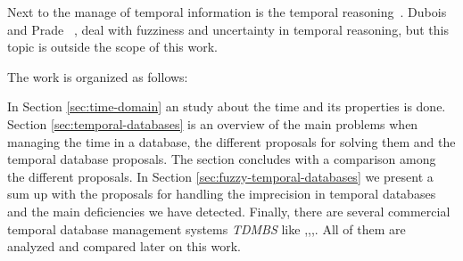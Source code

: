 Next to the manage of temporal information is the temporal reasoning~\cite{Allen83}. Dubois and Prade ~\cite{Dubois:jucs_9_9:fuzziness_and_uncertainty_in},\cite{Dubois89} deal with fuzziness and uncertainty in temporal reasoning, but this topic is outside the scope of this work.


The work is organized as follows: 

In Section \ref{sec:time-domain} an study about the time and its properties is done. Section \ref{sec:temporal-databases} is an overview of the main problems when managing the time in a database, the different proposals for solving them and the temporal database proposals. The section concludes with a comparison among the different proposals. In Section \ref{sec:fuzzy-temporal-databases} we present a sum up with the proposals for handling the imprecision in temporal databases and the main deficiencies we have detected. Finally, there are several commercial temporal database management systems  \emph{TDMBS} like \cite{oracle2009},\cite{posgree2009},\cite{teradata2011},\cite{timedb2005}. All of them are analyzed and compared later on this work. 
